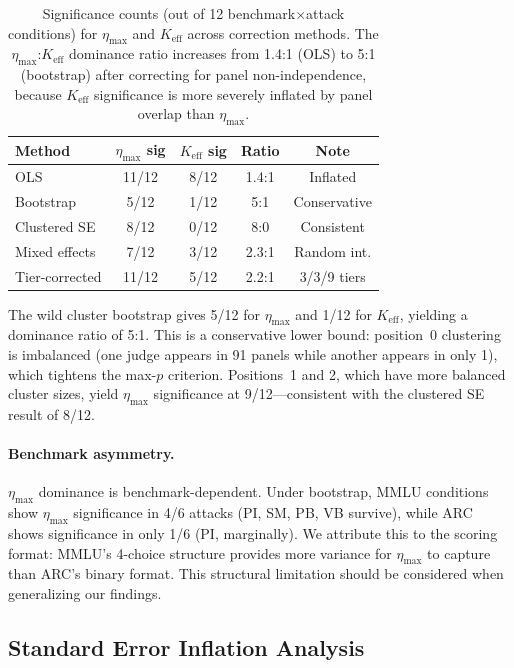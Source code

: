 \documentclass[11pt,a4paper]{article}
\newcommand{\etamax}{\ensuremath{\eta_{\max}}}
\newcommand{\keff}{\ensuremath{K_{\text{eff}}}}
\begin{document}
\begin{table}[t]
\centering
\small
\begin{tabular}{lcccc}
\toprule
\textbf{Method} & \textbf{$\etamax$ sig} & \textbf{$\keff$ sig} & \textbf{Ratio} & \textbf{Note} \\
\midrule
OLS & 11/12 & 8/12 & 1.4:1 & Inflated \\
Bootstrap & 5/12 & 1/12 & 5:1 & Conservative \\
Clustered SE & 8/12 & 0/12 & 8:0 & Consistent \\
Mixed effects & 7/12 & 3/12 & 2.3:1 & Random int. \\
Tier-corrected & 11/12 & 5/12 & 2.2:1 & 3/3/9 tiers \\
\bottomrule
\end{tabular}
\caption{Significance counts (out of 12 benchmark$\times$attack conditions) for $\etamax$ and $\keff$ across correction methods. The $\etamax$:$\keff$ dominance ratio increases from 1.4:1 (OLS) to 5:1 (bootstrap) after correcting for panel non-independence, because $\keff$ significance is more severely inflated by panel overlap than $\etamax$.}
\label{tab:correction_comparison}
\end{table}

The wild cluster bootstrap gives 5/12 for $\etamax$ and 1/12 for $\keff$, yielding a dominance ratio of 5:1.
This is a conservative lower bound: position~0 clustering is imbalanced (one judge appears in 91 panels while another appears in only 1), which tightens the max-$p$ criterion.
Positions~1 and 2, which have more balanced cluster sizes, yield $\etamax$ significance at 9/12---consistent with the clustered SE result of 8/12.

\paragraph{Benchmark asymmetry.}
$\etamax$ dominance is benchmark-dependent.
Under bootstrap, MMLU conditions show $\etamax$ significance in 4/6 attacks (PI, SM, PB, VB survive), while ARC shows significance in only 1/6 (PI, marginally).
We attribute this to the scoring format: MMLU's 4-choice structure provides more variance for $\etamax$ to capture than ARC's binary format.
This structural limitation should be considered when generalizing our findings.

\subsection{Standard Error Inflation Analysis}
\label{sec:se_inflation}
\end{document}
